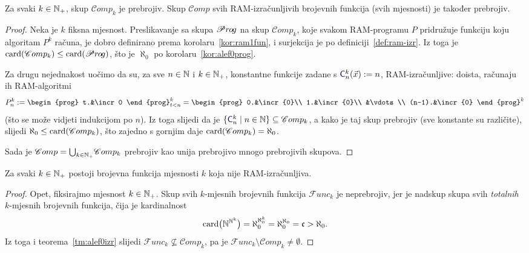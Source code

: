 \begin{teorem}[{name=[prebrojivost skupa $\mathscr Comp$]}]\label{tm:alef0izr}
Za svaki $k\in{\mathbb N}_+$, skup $\mathscr Comp_k$ je prebrojiv\!. Skup $\mathscr Comp$ svih RAM-izračunljivih brojevnih funkcija (svih mjesnosti) je također prebrojiv\!.
\end{teorem}
\begin{proof}
Neka je $k$ fiksna mjesnost. Preslikavanje
	sa skupa $\mathscr Pr\mspace{-1mu}o\mspace{-2mu}g$ na skup $\mathscr Comp_k$,
	koje svakom RAM-programu $P$ pridružuje funkciju koju algoritam $P^k$ računa, je dobro definirano prema korolaru~\ref{kor:ram1fun}, i surjekcija je po definiciji~\ref{def:ram-izr}. Iz toga je $\operatorname{card}(\mathscr Comp_k)\le\operatorname{card}(\mathscr Pr\mspace{-1mu}o\mspace{-2mu}g)$, što je $\aleph_0$ po korolaru~\ref{kor:alef0prog}.

Za drugu nejednakost uočimo da su, za sve $n\in{\mathbb N}$ i $k\in{\mathbb N}_+$, konstantne funkcije zadane s
$\f{C}_n^k(\vec x):=n$, RAM-izračunljive: doista, računaju ih RAM-algoritmi
\begin{equation}\label{eq:konstRAM}
    P_n^k:=\begin{prog}
    t.&\incr0
    \end{prog}_{t<n}^k=\begin{prog}
    0.&\incr{0}\\
    1.&\incr{0}\\
    &\vdots\\
    (n-1).&\incr{0}
    \end{prog}^k
\end{equation}
(što se može vidjeti indukcijom po $n$).
Iz toga slijedi da je $\{\f{C}_n^k\mid n\in\N\}\subseteq\mathscr Comp_k$, a kako je taj skup prebrojiv (sve konstante su različite), slijedi $\aleph_0\le\operatorname{card}(\mathscr Comp_k)$, što zajedno s gornjim daje $\operatorname{card}(\mathscr Comp_k)=\aleph_0$.

Sada je $\mathscr Comp=\bigcup_{k\in{\mathbb N}_+}\!\mathscr Comp_k$ prebrojiv kao unija prebrojivo mnogo prebrojivih skupova.
\end{proof}

\begin{korolar}[{name=[postojanje ne-RAM-izračunljivih funkcija]}]\label{kor:exneizrk}
Za svaki $k\in{\mathbb N}_+$ postoji brojevna funkcija mjesnosti $k$ koja nije RAM-izračunljiva.
\end{korolar}
\begin{proof}
Opet, fiksirajmo mjesnost $k\in{\mathbb N}_+$. Skup svih $k$-mjesnih brojevnih funkcija $\mathscr Func_k$ je neprebrojiv\!, jer je nadskup skupa svih \emph{totalnih} $k$-mjesnih brojevnih funkcija, čija je kardinalnost
\begin{equation}
    \operatorname{card}\bigl({\mathbb N}^{{\mathbb N}^k}\bigr)=\aleph_0^{\aleph_0^k}=\aleph_0^{\aleph_0}=\mathfrak c>\aleph_0\text.
\end{equation}
    Iz toga i teorema~\ref{tm:alef0izr} slijedi $\mathscr Func_k\nsubseteq\mathscr Comp_k$, pa je $\mathscr Func_k\!\setminus\mathscr Comp_k\ne\emptyset$.
\end{proof}

